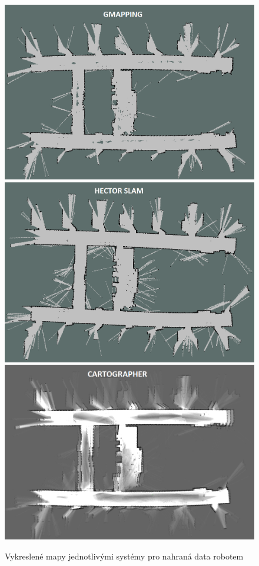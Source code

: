 \documentclass[12pt]{report}
\begin{document}
\begin{figure}[!ht]
	\begin{center}
		\includegraphics[width=0.6\columnwidth]{imgs/Maps/Robot/5patromoreslower/gmapping_5patromoreslower.png}
		\includegraphics[width=0.6\columnwidth]{imgs/Maps/Robot/5patromoreslower/hector_5patromoreslower.png}
		\includegraphics[width=0.6\columnwidth]{imgs/Maps/Robot/5patromoreslower/cartographer_5patromoreslower.png}
	\end{center}
	\caption{Vykreslené mapy jednotlivými systémy pro nahraná data robotem}
	\label{fig:mapy_robot}
\end{figure}
\end{document}
